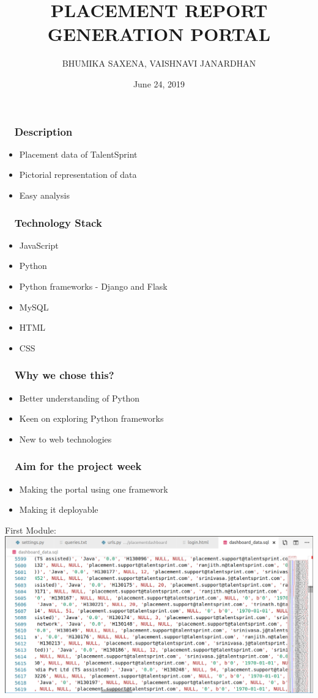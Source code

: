 \documentclass{beamer}
\title[Placement Report Generation Portal]{PLACEMENT REPORT GENERATION PORTAL } %
\author[Bhumika, Vaishnavi]{BHUMIKA SAXENA, VAISHNAVI JANARDHAN} %
{
\medskip
}
\date{June 24, 2019} %
\begin{document}
\begin{frame}
\titlepage %
\end{frame}

\begin{frame}
\frametitle{~ Description}
\begin {itemize}
\item{Placement data of TalentSprint}
\bigskip
\bigskip
\item{Pictorial representation of data}
\bigskip
\bigskip
\item{Easy analysis}
\end{itemize}
\end{frame}

\begin{frame}
\frametitle{ ~ Technology Stack} 
\begin{itemize}
\item{JavaScript}
\item{Python} 
\item{Python frameworks - Django and Flask}
\item{MySQL}
\item{HTML} 
\item{CSS}
\end{itemize}
\end{frame}

\begin{frame}
\frametitle{ ~ Why we chose this?} 
\begin{itemize}
\item{Better understanding of Python}
\item{Keen on exploring Python frameworks}
\item{New to web technologies} 
\end{itemize}
\end{frame}

\begin{frame}
\frametitle{ ~ Aim for the project week} 
\begin{itemize}
\item{Making the portal using one framework}
\item{Making it deployable}
\end{itemize}
\end{frame}

\begin{frame}
\centering
First Module:
\includegraphics[width = 15cm]{1.png}
\end{frame}
\end{document}
